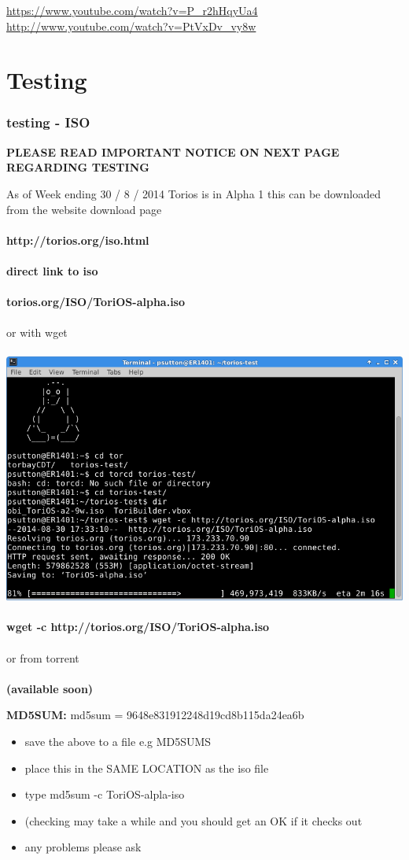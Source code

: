 \documentclass[12pt,a4paper]{book}
\begin{document}
\url{https://www.youtube.com/watch?v=P_r2hHqyUa4} \\
\url{http://www.youtube.com/watch?v=PtVxDv_vy8w} \\



\newpage
\chapter{Testing}
\subsection {testing - ISO}
\bf{PLEASE READ IMPORTANT NOTICE ON NEXT PAGE REGARDING TESTING}

As of Week ending 30 / 8 / 2014 Torios is in Alpha 1 this can be downloaded from the website download page  \\ \\
\textbf{http://torios.org/iso.html}\\ \\
\textbf{direct link to iso} \\ \\
\textbf{torios.org/ISO/ToriOS-alpha.iso} \\ \\
or with wget  \\ \\

\includegraphics[width=0.7\linewidth]{torios-wget-download} \\ \\
\textbf{wget -c http://torios.org/ISO/ToriOS-alpha.iso} \\ \\
or from torrent \\ \\
\textbf{(available soon)}

\textbf{MD5SUM: } md5sum = 9648e831912248d19cd8b115da24ea6b \\ 
\begin{itemize}
\item{save the above to a file e.g MD5SUMS}
\item{place this in the SAME LOCATION as the iso file}
\item{type md5sum -c ToriOS-alpla-iso} 
\item({checking may take a while and you should get an OK if it checks out}
\item{any problems please ask}
\end{itemize}
\end{document}

